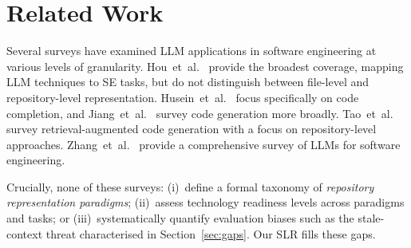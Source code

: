 \section{Related Work}\label{sec:relatedwork}

Several surveys have examined LLM applications in software engineering at
various levels of granularity.  Hou~et~al.~\cite{hou2024llmse_slr} provide the
broadest coverage, mapping LLM techniques to SE tasks, but do not distinguish
between file-level and repository-level representation.
Husein~et~al.~\cite{husein2025llmcompletion_slr} focus specifically on code
completion, and Jiang~et~al.~\cite{jiang2026surveycodegen} survey code
generation more broadly.  Tao~et~al.~\cite{tao2026ragsurvey} survey
retrieval-augmented code generation with a focus on repository-level
approaches.  Zhang~et~al.~\cite{zhang2026surveyse} provide a comprehensive
survey of LLMs for software engineering.

Crucially, none of these surveys: (i)~define a formal taxonomy of
\emph{repository representation paradigms}; (ii)~assess technology readiness
levels across paradigms and tasks; or (iii)~systematically quantify evaluation
biases such as the stale-context threat characterised in
Section~\ref{sec:gaps}.  Our SLR fills these gaps.
